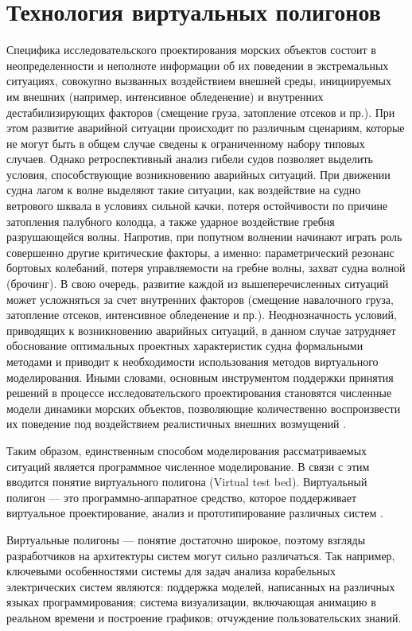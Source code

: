 \section{Технология виртуальных полигонов}
\label{ch1_1_1}

Специфика исследовательского проектирования морских объектов состоит в неопределенности и неполноте информации об их поведении в экстремальных ситуациях, совокупно вызванных воздействием внешней среды, инициируемых им внешних (например, интенсивное обледенение) и внутренних дестабилизирующих факторов (смещение груза, затопление отсеков и пр.). При этом развитие аварийной ситуации происходит по различным сценариям, которые не могут быть в общем случае сведены к ограниченному набору типовых случаев. Однако ретроспективный анализ гибели судов позволяет выделить условия, способствующие возникновению аварийных ситуаций. При движении судна лагом к волне выделяют такие ситуации, как воздействие на судно ветрового шквала в условиях сильной качки, потеря остойчивости по причине затопления палубного колодца, а также ударное воздействие гребня разрушающейся волны. Напротив, при попутном волнении начинают играть роль совершенно другие критические факторы, а именно: параметрический резонанс бортовых колебаний, потеря управляемости на гребне волны, захват судна волной (брочинг). В свою очередь, развитие каждой из вышеперечисленных ситуаций может усложняться за счет внутренних факторов (смещение навалочного груза, затопление отсеков, интенсивное обледенение и пр.). Неоднозначность условий, приводящих к возникновению аварийных ситуаций, в данном случае затрудняет обоснование оптимальных проектных характеристик судна формальными методами и приводит к необходимости использования методов виртуального моделирования. Иными словами, основным инструментом поддержки принятия решений в процессе исследовательского проектирования становятся численные модели динамики морских объектов, позволяющие количественно воспроизвести их поведение под воздействием реалистичных внешних возмущений \citep{nechaev_ai}.

Таким образом, единственным способом моделирования рассматриваемых ситуаций является программное численное моделирование. В связи с этим вводится понятие виртуального полигона (Virtual test bed).
Виртуальный полигон --– это программно-аппаратное средство, которое поддерживает виртуальное проектирование, анализ и прототипирование различных систем \citep{vtb_ship_ee} \citep{vtb_ILRO}. 

Виртуальные полигоны --- понятие достаточно широкое, поэтому взгляды разработчиков на архитектуры систем могут сильно различаться. Так например, ключевыми особенностями системы для задач анализа корабельных электрических систем \citep{vtb_ship_ee} являются: поддержка моделей, написанных на различных языках программирования; система визуализации, включающая анимацию в реальном времени и построение графиков; отчуждение пользовательских знаний.

